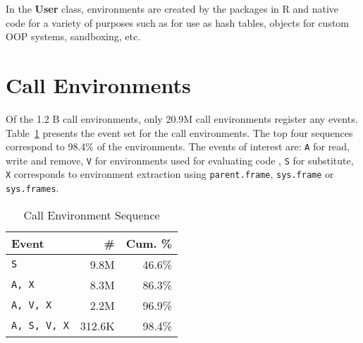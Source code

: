 \documentclass[10pt,review,sigplan,anonymous=true,authorversion=true,nonacm=true]{acmart}
\newcommand{\code}[1]{\lstinline |#1|\xspace}
\begin{document}
In the \textbf{User} class, environments are created by the packages in R and
native code for a variety of purposes such as for use as hash tables, objects
for custom OOP systems, sandboxing, etc.


\section{Call Environments}

Of the 1.2 B call environments, only 20.9M call environments register any
events. Table~\ref{table:call_env_seq} presents the event set for the call
environments. The top four sequences correspond to 98.4\% of the environments.
The events of interest are: \texttt{A} for read, write and remove, \texttt{V}
for environments used for evaluating code , \texttt{S} for substitute,
\texttt{X} corresponds to environment extraction using \code{parent.frame},
\code{sys.frame} or \code{sys.frames}.

\begin{table}[!h]
  \vspace{-3mm}
  \small
  \caption{Call Environment Sequence} \label{table:call_env_seq}
  \centering
  \begin{tabular}{lrr}
    \toprule
    \textbf{Event}&\textbf{\#}&\textbf{Cum. \%}\\
    \midrule
    \texttt{S}&9.8M&46.6\%\\
    \texttt{A, X}&8.3M&86.3\%\\
    \texttt{A, V, X}&2.2M&96.9\%\\
    \texttt{A, S, V, X}&312.6K&98.4\%\\
    \bottomrule
  \end{tabular}
\end{table}
\end{document}
